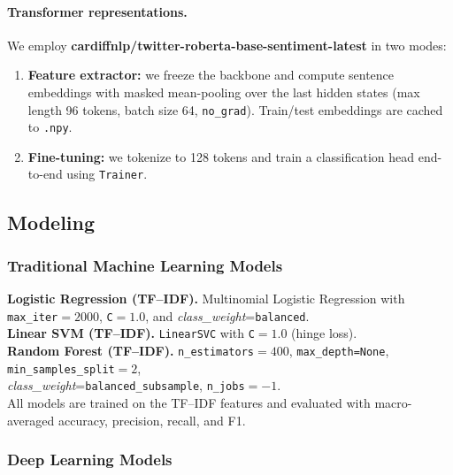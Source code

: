 \documentclass[10pt]{article}
\begin{document}
\paragraph{Transformer representations.}
We employ \textbf{cardiffnlp/twitter-roberta-base-sentiment-latest} in two modes:
\begin{enumerate}
  \item \textbf{Feature extractor:} we freeze the backbone and compute sentence embeddings with masked mean-pooling over the last hidden states (max length 96 tokens, batch size 64, \texttt{no\_grad}). Train/test embeddings are cached to \texttt{.npy}.
  \item \textbf{Fine-tuning:} we tokenize to 128 tokens and train a classification head end-to-end using \texttt{Trainer}.
\end{enumerate}
\subsection{Modeling}

\subsubsection{Traditional Machine Learning Models}
\textbf{Logistic Regression (TF--IDF).} Multinomial Logistic Regression with \texttt{max\_iter}$=2000$, \texttt{C}$=1.0$, and \textit{class\_weight}=\texttt{balanced}.\\
\textbf{Linear SVM (TF--IDF).} \texttt{LinearSVC} with \texttt{C}$=1.0$ (hinge loss).\\
\textbf{Random Forest (TF--IDF).} \texttt{n\_estimators}$=400$, \texttt{max\_depth=None}, \texttt{min\_samples\_split}$=2$,\\
\textit{class\_weight}=\texttt{balanced\_subsample}, \texttt{n\_jobs}$=-1$.\\
All models are trained on the TF--IDF features and evaluated with macro-averaged accuracy, precision, recall, and F1.

\subsubsection{Deep Learning Models}
\end{document}

